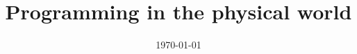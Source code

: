 \documentclass{article}
\title{Programming in the physical world}
\date{\today}
\begin{document}
\maketitle

\begin{abstract}

\end{abstract}




%
%
%
\end{document}
